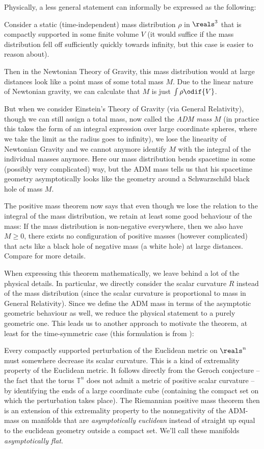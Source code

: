 \documentclass[titlepage,numbers=noenddot,headinclude,oneside,%
footinclude=true,cleardoublepage=empty,%
BCOR=5mm,paper=a4,fontsize=11pt,%
english,%
]{scrartcl}
\begin{document}
Physically, a less general statement can informally be expressed as the following: 

Consider a static (\ie time-independent) mass distribution \( \rho \) in \( \reals^3 \) that is compactly supported in some finite volume \( V \) (it would suffice if the mass distribution fell off sufficiently quickly towards infinity, but this case is easier to reason about).

Then in the Newtonian Theory of Gravity, this mass distribution would at large distances look like a point mass of some total mass \( M \). Due to the linear nature of Newtonian gravity, we can calculate that \( M \) is just \( \int \rho \odif{V} \).

But when we consider Einstein's Theory of Gravity (via General Relativity), though we can still assign a total mass, now called the \emph{ADM mass} \( M \) (in practice this takes the form of an integral expression over large coordinate spheres, where we take the limit as the radius goes to infinity), we lose the linearity of Newtonian Gravity and we cannot anymore identify \( M \) with the integral of the individual masses anymore. Here our mass distribution bends spacetime in some (possibly very complicated) way, but the ADM mass tells us that his spacetime geometry asymptotically looks like the geometry around a Schwarzschild black hole of mass \( M \).

The positive mass theorem now says that even though we lose the relation to the integral of the mass distribution, we retain at least some good behaviour of the mass: If the mass distribution is non-negative everywhere, then we also have \( M\geq 0 \), \ie there exists no configuration of positive masses (however complicated) that acts like a black hole of negative mass (a white hole) at large distances. Compare \cite[Chapter 7]{leeGeometricRelativity2019} for more details.

When expressing this theorem mathematically, we leave behind a lot of the physical details. In particular, we directly consider the scalar curvature \( R \) instead of the mass distribution (since the scalar curvature is proportional to mass in General Relativity). Since we define the ADM mass in terms of the asymptotic geometric behaviour as well, we reduce the physical statement to a purely geometric one. This leads us to another approach to motivate the theorem, at least for the time-symmetric case (this formulation is from \cite[page 1]{braySpacetimeHarmonicFunctions2021}):

Every compactly supported perturbation of the Euclidean metric on \( \reals^n \) must somewhere decrease its scalar curvature. This is a kind of extremality property of the Euclidean metric. It follows directly from the Geroch conjecture -- the fact that the torus \( \mathbb{T}^n \) does not admit a metric of positive scalar curvature -- by identifying the ends of a large coordinate cube (containing the compact set on which the perturbation takes place). The Riemannian positive mass theorem then is an extension of this extremality property to the nonnegativity of the ADM-mass on manifolds that are \emph{asymptotically euclidean} instead of straight up equal to the euclidean geometry outside a compact set. We'll call these manifolds \emph{asymptotically flat}.
\end{document}
